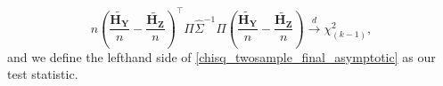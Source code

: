 \documentclass[11pt]{article} %
\begin{document}
\begin{equation}\label{chisq_twosample_final_asymptotic}
n
	\left(
\frac{\tilde{\boldsymbol{H}_{\boldsymbol{Y}}}}{n} -
\frac{\tilde{\boldsymbol{H}_{\boldsymbol{Z}}}}{n}
\right)^\top
\Pi
	\hat{\Sigma}^{-1} \Pi
	\left(
	\frac{\tilde{\boldsymbol{H}_{\boldsymbol{Y}}}}{n} -
	\frac{\tilde{\boldsymbol{H}_{\boldsymbol{Z}}}}{n}
	\right)
	\stackrel{d}{\to}
\chi^2_{(k-1)},
\end{equation}
and we define the lefthand side of \eqref{chisq_twosample_final_asymptotic} as our test statistic.







\end{document}

